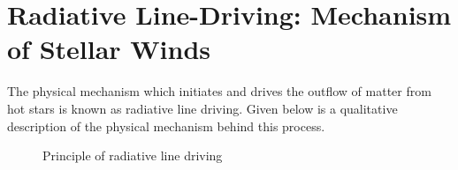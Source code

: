 	\section{Radiative Line-Driving: Mechanism of Stellar Winds} \label{tool:radiative-line-driving}
		The physical mechanism which initiates and drives the outflow of matter from hot stars is known as radiative line driving. Given below is a qualitative description of the physical mechanism behind this process.
		\begin{figure}[h!]
			\centering
			\caption{Principle of radiative line driving}
			\label{rad-line-drive-principle}
			 \hfill

\end{figure}
